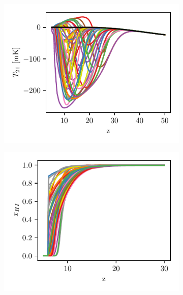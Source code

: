 \begin{figure}
    \centering
    \begin{subfigure}{.5\textwidth}
    \includegraphics{globalemu/figs/Example_signals.pdf}
    \end{subfigure}%
    \begin{subfigure}{.5\textwidth}
    \includegraphics{globalemu/figs/xHI_Example_signals.pdf}
    \end{subfigure}

\end{figure}
